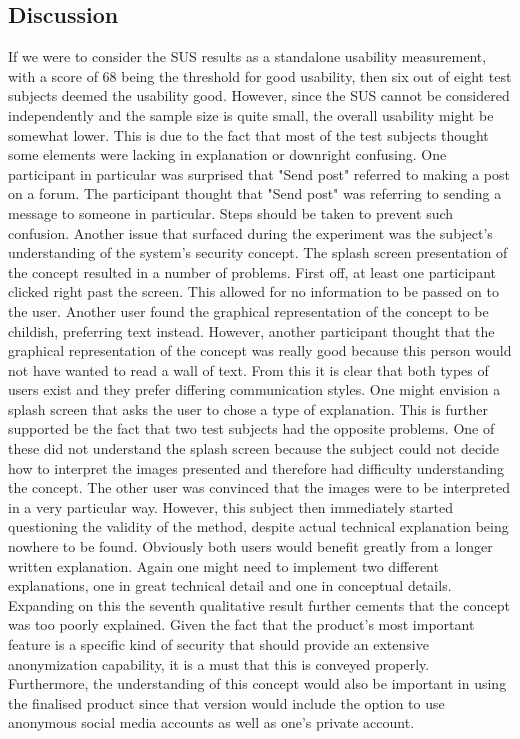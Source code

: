 \subsection{Discussion}
If we were to consider the SUS results as a standalone usability measurement, with a score of 68 being the threshold for good usability, then six out of eight test subjects deemed the usability good. However, since the SUS cannot be considered independently and the sample size is quite small, the overall usability might be somewhat lower. This is due to the fact that most of the test subjects thought some elements were lacking in explanation or downright confusing. One participant in particular was surprised that "Send post" referred to making a post on a forum. The participant thought that "Send post" was referring to sending a message to someone in particular. Steps should be taken to prevent such confusion. 
\newline
Another issue that surfaced during the experiment was the subject's understanding of the system's security concept. The splash screen presentation of the concept resulted in a number of problems. First off, at least one participant clicked right past the screen. This allowed for no information to be passed on to the user. Another user found the graphical representation of the concept to be childish, preferring text instead. However, another participant thought that the graphical representation of the concept was really good because this person would not have wanted to read a wall of text. From this it is clear that both types of users exist and they prefer differing communication styles. One might envision a splash screen that asks the user to chose a type of explanation. This is further supported be the fact that two test subjects had the opposite problems. One of these did not understand the splash screen because the subject could not decide how to interpret the images presented and therefore had difficulty understanding the concept. The other user was convinced that the images were to be interpreted in a very particular way. However, this subject then immediately started questioning the validity of the method, despite actual technical explanation being nowhere to be found. Obviously both users would benefit greatly from a longer written explanation. Again one might need to implement two different explanations, one in great technical detail and one in conceptual details. 
Expanding on this the seventh qualitative result further cements that the concept was too poorly explained. Given the fact that the product's most important feature is a specific kind of security that should provide an extensive anonymization capability, it is a must that this is conveyed properly. Furthermore, the understanding of this concept would also be important in using the finalised product since that version would include the option to use anonymous social media accounts as well as one's private account.